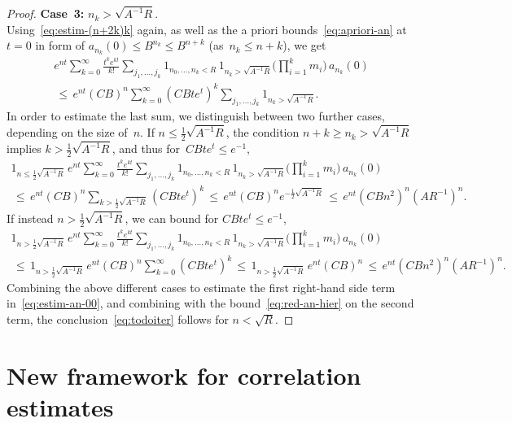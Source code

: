 \documentclass[a4paper,11pt,reqno,noindent]{amsart}
\theoremstyle{plain}
\theoremstyle{definition}
\numberwithin{equation}{section}
\begin{document}
\begin{proof}
\medskip\noindent
{\bf Case~3:} $n_k>\sqrt{A^{-1}R}$.\\
Using~\eqref{eq:estim-(n+2k)k} again, as well as the a priori bounds~\eqref{eq:apriori-an} at $t=0$ in form of $a_{n_k}(0)\le B^{n_k}\le B^{n+k}$ (as~$n_k\le n+k$), we get
\begin{multline}
e^{nt}\sum_{k=0}^\infty \tfrac{t^ke^{kt}}{k!}\sum_{j_1,\ldots,j_k}1_{n_0,\ldots,n_k<R}\,1_{n_k>\sqrt{A^{-1}R}}\Big(\prod_{i=1}^km_i\Big)\,a_{n_k}(0)\\[-3mm]
\,\le\,e^{nt}(CB)^n\sum_{k=0}^\infty (CBte^{t})^k\sum_{j_1,\ldots,j_k}1_{n_k>\sqrt{A^{-1}R}}.
\end{multline}
In order to estimate the last sum, we distinguish between two further cases, depending on the size of~$n$. If $n\le\frac12\sqrt{A^{-1}R}$, the condition $n+k\ge n_k> \sqrt{A^{-1}R}$ implies $k> \frac12\sqrt{A^{-1}R}$, and thus for~$CBte^{t}\le e^{-1}$,
\begin{multline}
1_{n\le \frac12\sqrt{A^{-1}R}}\,e^{nt}\sum_{k=0}^\infty \tfrac{t^ke^{kt}}{k!} \sum_{j_1,\ldots,j_k} 1_{n_0,\ldots,n_k<R}\,1_{n_k> \sqrt{A^{-1}R}}\Big(\prod_{i=1}^km_i\Big)\,a_{n_k}(0)\\
\,\le\,e^{nt}(CB)^n\sum_{k>\frac12\sqrt{A^{-1}R}}(CBte^t)^k
\,\le\,e^{nt}(CB)^ne^{-\frac12\sqrt{A^{-1}R}}
\,\le\,e^{nt}(CBn^2)^n(AR^{-1})^n.
\end{multline}
If instead $n>\frac12\sqrt{A^{-1}R}$, we can bound for $CBte^t\le e^{-1}$,
\begin{multline}
1_{n>\frac12\sqrt{A^{-1}R}}\,e^{nt}\sum_{k=0}^\infty \tfrac{t^ke^{kt}}{k!}\sum_{j_1,\ldots,j_k}1_{n_0,\ldots,n_k<R}\,1_{n_k> \sqrt{A^{-1}R}}\Big(\prod_{i=1}^km_i\Big)\,a_{n_k}(0)\\
\,\le\,1_{n>\frac12\sqrt{A^{-1}R}}\,e^{nt}(CB)^n\sum_{k=0}^\infty (CBte^{t})^k
\,\le\,1_{n> \frac12\sqrt{A^{-1}R}}\,e^{nt}(CB)^n
\,\le\,e^{nt}(CBn^2)^n(AR^{-1})^{n}.
\end{multline}
Combining the above different cases to estimate the first right-hand side term in~\eqref{eq:estim-an-00}, and combining with the bound~\eqref{eq:red-an-hier} on the second term, the conclusion~\eqref{eq:todoiter} follows for $n<\sqrt R$.
\end{proof}

\section{New framework for correlation estimates}
\end{document}
